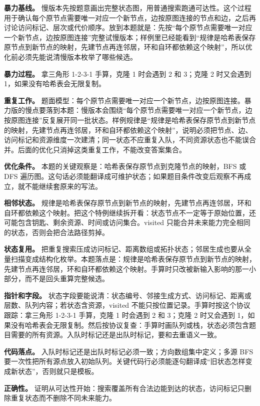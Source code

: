 \textbf{暴力基线。} 慢版本先按题意画出完整状态图，用普通搜索跑通可达性。这个过程用于确认每个原节点需要唯一对应一个新节点，边按原图连接的节点和边，之后再讨论访问标记、层次或代价顺序。放到本题就是：先按“每个原节点需要唯一对应一个新节点，边按原图连接”完整试慢版本；样例里已经能看到“规律是哈希表保存原节点到新节点的映射，先建节点再连邻居，环和自环都依赖这个映射”，所以优化前必须先能说清慢版本枚举了哪些候选。

\textbf{暴力过程。} 拿三角形 1-2-3-1 手算，克隆 1 时会遇到 2 和 3；克隆 2 时又会遇到 1，如果没有哈希表会无限复制。

\textbf{重复工作。} 题面模型：每个原节点需要唯一对应一个新节点，边按原图连接。暴力版的慢点要落到本题：慢版本会围绕“每个原节点需要唯一对应一个新节点，边按原图连接”反复展开同一批状态。样例规律是“规律是哈希表保存原节点到新节点的映射，先建节点再连邻居，环和自环都依赖这个映射”，说明必须把节点、边、访问标记和资源维度一次建清；同一状态不应重复入队，不同资源状态也不能误合并。后面的优化只消掉这类重复工作，不能改变答案集合。

\textbf{优化条件。} 本题的关键观察是：哈希表保存原节点到克隆节点的映射，BFS 或 DFS 遍历图。这句话必须能翻译成可维护状态；如果题目条件改变后观察不再成立，就不能继续套原来的写法。

\textbf{相邻状态。} 规律是哈希表保存原节点到新节点的映射，先建节点再连邻居，环和自环都依赖这个映射。把这个特例继续拆开看：状态节点不一定等于原始位置，还可能包含钥匙、剩余资源、时间或访问集合。visited 只能合并未来能力完全相同的状态，否则会把合法路径剪掉。

\textbf{状态复用。} 把重复搜索压成访问标记、距离数组或拓扑状态；邻居生成也要从全量扫描变成结构化枚举。本题落点是：规律是哈希表保存原节点到新节点的映射，先建节点再连邻居，环和自环都依赖这个映射。手算时只改被新输入影响的那一小部分，而不是回头重算完整候选。

\textbf{指针和字段。} 状态字段要能说清：状态编号、邻接生成方式、访问标记、距离或层数、队列内容；若状态含资源，visited 不能只按位置记录。手算时按这个协议跟踪：拿三角形 1-2-3-1 手算，克隆 1 时会遇到 2 和 3；克隆 2 时又会遇到 1，如果没有哈希表会无限复制。然后按协议复查：手算时画队列或栈，状态必须包含题目需要的所有资源。入队时标记还是出队时标记，要和去重语义一致。

\textbf{代码落点。} 入队时标记还是出队时标记必须一致；方向数组集中定义；多源 BFS 要一次性把所有源点放入初始队列。关键代码行必须能逐句翻译成“旧状态怎样变成新状态”，否则就只是模板。

\textbf{正确性。} 证明从可达性开始：搜索覆盖所有合法边能到达的状态，访问标记只删除重复状态而不删除不同未来能力。

